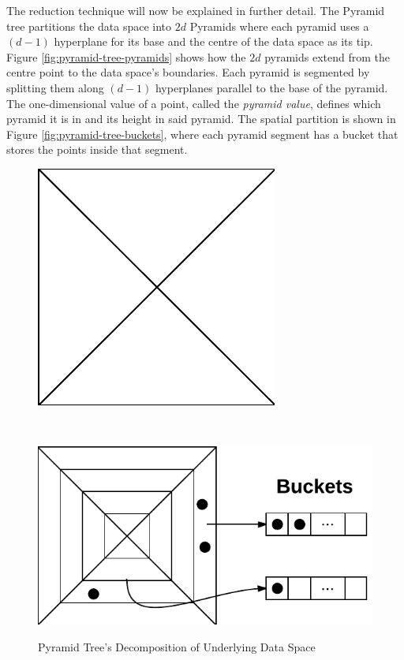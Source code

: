 The reduction technique will now be explained in further detail. The Pyramid tree partitions the data space into $2d$ Pyramids where each pyramid uses a $(d - 1)$ hyperplane for its base and the centre of the data space as its tip. Figure \ref{fig:pyramid-tree-pyramids} shows how the $2d$ pyramids extend from the centre point to the data space's boundaries. Each pyramid is segmented by splitting them along $(d-1)$ hyperplanes parallel to the base of the pyramid. The one-dimensional value of a point, called the \textit{pyramid value}, defines which pyramid it is in and its height in said pyramid. The spatial partition is shown in Figure \ref{fig:pyramid-tree-buckets}, where each pyramid segment has a bucket that stores the points inside that segment.

\begin{figure}
		\begin{center}
			\begin{subfloat}{%
				\includegraphics[scale=0.7]{figures/pyramid_tree_partition.pdf}
			}
			\end{subfloat}~~~~
			\begin{subfloat} {%
				\includegraphics[scale=0.7]{figures/pyramid_tree_buckets.pdf}
			}
			\end{subfloat}
		\end{center}

		\caption{Pyramid Tree's Decomposition of Underlying Data Space}
		\label{fig:pyramid-tree-partition}
\end{figure}

